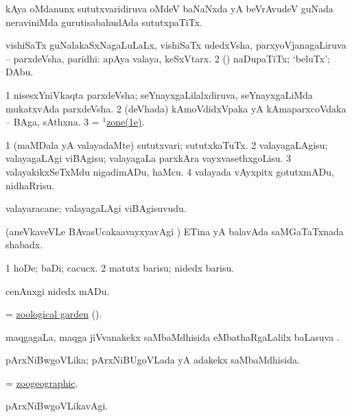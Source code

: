  kAya oMdanunx sututxvaridiruva oMdeV baNaNxda yA beVrAvudeV guNada neraviniMda gurutisabahudAda sututxpaTiTx. 

 vishiSaTx guNalakaSxNagaLuLaLx, vishiSaTx udedxVsha, parxyoVjanagaLiruva -- parxdeVsha, paridhi:  apAya valaya, keSxVtarx. 
\eanum
\numie
\num{2} (\pArxparx) naDupaTiTx; `beluTx'; DAbu.
\enum
\emng 

\noindent
\gl{\pagu} 
\bmng
\bnum
\num{1}  nisesxYniVkaqta parxdeVsha; seYnayxgaLilalxdiruva, seYnayxgaLiMda mukatxvAda parxdeVsha. 
\num{2}  (deVhada) kAmoVdidxVpaka yA kAmaparxcoVdaka -- BAga, sAthxna.   
\num{3}   =  \hyperlink{zone(1)1e}{$^1$zone(1e)}.
\enum
\emng
\eentry

\bentry
{} 
\gl{\sakirx} 
\bmng
\bnum
\num{1} (maMDala yA valayadaMte) sututxvari; sututxkaTuTx. 
\num{2} valayagaLAgisu; valayagaLAgi viBAgisu; valayagaLa parxkAra vayxvasethxgoLisu.  
\num{3} valayakikxSeTxMdu nigadimADu, haMcu. 
\num{4} valayada vAyxpitx gotutxmADu, nidhaRrisu.
\enum
\emng
\eentry

\bentry
{} 
\gl{\nA} 
\bmng
valayaracane; valayagaLAgi viBAgisuvudu.
\emng
\eentry

\bentry
{} 
\gl{\nA} 
\bmng
(aneVkaveVLe BAvasUcaka{a}vayxyavAgi \parx) ETina yA balavAda saMGaTaTxnada shabadx.
\emng
\eentry

\bentry
{} 
\gl{\sakirx} 
\bmng
\bnum
\num{1} hoDe; baDi; cacucx. 
\num{2} matutx barisu; nidedx barisu.
\enum
\emng

\noindent         
\gl{\akirx} 
\bmng
cenAnxgi nidedx mADu.
\emng
\eentry

\bentry
{} 
\gl{\nA} 
\bmng
= \hyperlink{zoological garden}{zoological garden} (\saMkiSx).
\emng
\eentry

\bentry
{} 
\gl{\sapUpa} 
\bmng
maqgagaLa, maqga jiVvanakekx saMbaMdhisida eMbathaRgaLalilx baLasuva \sapUpa.
\emng
\eentry

\bentry
{} 
\gl{\gu} 
\bmng
pArxNiBwgoVLika; pArxNiBUgoVLada yA adakekx saMbaMdhisida.
\emng
\eentry

\bentry
{} 
\gl{\gu} 
\bmng
= \hyperlink{zoogeographic}{zoogeographic}.
\emng
\eentry

\bentry
{} 
\gl{\kirxvi} 
\bmng
pArxNiBwgoVLikavAgi.
\emng
\eentry

